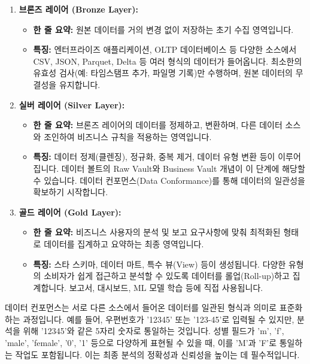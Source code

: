 \documentclass[11pt,a4paper]{article}
\begin{document}
\begin{enumerate}
    \item \textbf{브론즈 레이어 (Bronze Layer):}
    \begin{itemize}
        \item \textbf{한 줄 요약:} 원본 데이터를 거의 변경 없이 저장하는 초기 수집 영역입니다.
        \item \textbf{특징:} 엔터프라이즈 애플리케이션, OLTP 데이터베이스 등 다양한 소스에서 CSV, JSON, Parquet, Delta 등 여러 형식의 데이터가 들어옵니다. 최소한의 유효성 검사(예: 타임스탬프 추가, 파일명 기록)만 수행하며, 원본 데이터의 무결성을 유지합니다.
    \end{itemize}

    \item \textbf{실버 레이어 (Silver Layer):}
    \begin{itemize}
        \item \textbf{한 줄 요약:} 브론즈 레이어의 데이터를 정제하고, 변환하며, 다른 데이터 소스와 조인하여 비즈니스 규칙을 적용하는 영역입니다.
        \item \textbf{특징:} 데이터 정제(클렌징), 정규화, 중복 제거, 데이터 유형 변환 등이 이루어집니다. 데이터 볼트의 Raw Vault와 Business Vault 개념이 이 단계에 해당할 수 있습니다. 데이터 컨포먼스(Data Conformance)를 통해 데이터의 일관성을 확보하기 시작합니다.
    \end{itemize}

    \item \textbf{골드 레이어 (Gold Layer):}
    \begin{itemize}
        \item \textbf{한 줄 요약:} 비즈니스 사용자의 분석 및 보고 요구사항에 맞춰 최적화된 형태로 데이터를 집계하고 요약하는 최종 영역입니다.
        \item \textbf{특징:} 스타 스키마, 데이터 마트, 특수 뷰(View) 등이 생성됩니다. 다양한 유형의 소비자가 쉽게 접근하고 분석할 수 있도록 데이터를 롤업(Roll-up)하고 집계합니다. 보고서, 대시보드, ML 모델 학습 등에 직접 사용됩니다.
    \end{itemize}
\end{enumerate}

\begin{tcolorbox}[mybox, title=데이터 컨포먼스 (Data Conformance)]
데이터 컨포먼스는 서로 다른 소스에서 들어온 데이터를 일관된 형식과 의미로 표준화하는 과정입니다. 예를 들어, 우편번호가 '12345' 또는 '123-45'로 입력될 수 있지만, 분석을 위해 '12345'와 같은 5자리 숫자로 통일하는 것입니다. 성별 필드가 'm', 'f', 'male', 'female', '0', '1' 등으로 다양하게 표현될 수 있을 때, 이를 'M'과 'F'로 통일하는 작업도 포함됩니다. 이는 최종 분석의 정확성과 신뢰성을 높이는 데 필수적입니다.
\end{tcolorbox}
\end{document}
